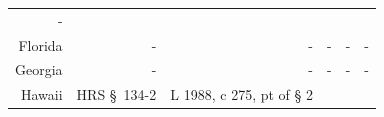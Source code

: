 \documentclass[]{article}
\begin{document}
\begin{longtable}[c]{@{}rrrrrr@{}}
\begin{minipage}[t]{0.10\columnwidth}
-
\strut\end{minipage}\tabularnewline
\begin{minipage}[t]{0.10\columnwidth}\raggedleft\strut
Florida
\strut\end{minipage} &
\begin{minipage}[t]{0.21\columnwidth}\raggedleft\strut
-
\strut\end{minipage} &
\begin{minipage}[t]{0.22\columnwidth}\raggedleft\strut
-
\strut\end{minipage} &
\begin{minipage}[t]{0.10\columnwidth}\raggedleft\strut
-
\strut\end{minipage} &
\begin{minipage}[t]{0.10\columnwidth}\raggedleft\strut
-
\strut\end{minipage} &
\begin{minipage}[t]{0.10\columnwidth}\raggedleft\strut
-
\strut\end{minipage}\tabularnewline
\begin{minipage}[t]{0.10\columnwidth}\raggedleft\strut
Georgia
\strut\end{minipage} &
\begin{minipage}[t]{0.21\columnwidth}\raggedleft\strut
-
\strut\end{minipage} &
\begin{minipage}[t]{0.22\columnwidth}\raggedleft\strut
-
\strut\end{minipage} &
\begin{minipage}[t]{0.10\columnwidth}\raggedleft\strut
-
\strut\end{minipage} &
\begin{minipage}[t]{0.10\columnwidth}\raggedleft\strut
-
\strut\end{minipage} &
\begin{minipage}[t]{0.10\columnwidth}\raggedleft\strut
-
\strut\end{minipage}\tabularnewline
\begin{minipage}[t]{0.10\columnwidth}\raggedleft\strut
Hawaii
\strut\end{minipage} &
\begin{minipage}[t]{0.21\columnwidth}\raggedleft\strut
HRS §~134-2
\strut\end{minipage} &
\begin{minipage}[t]{0.22\columnwidth}\raggedleft\strut
L 1988, c 275, pt of § 2
\strut\end{minipage} &
\begin{minipage}[t]{0.10\columnwidth}\raggedleft\strut

\end{minipage}
\end{longtable}
\end{document}
